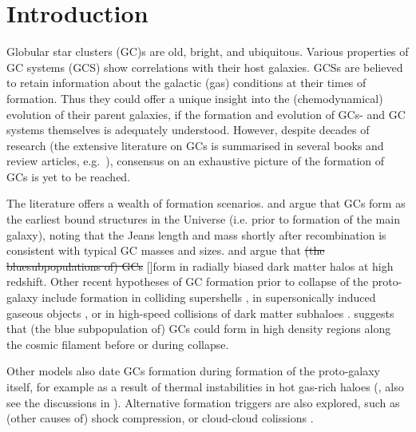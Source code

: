 \documentclass[a4paper,fleqn,usenatbib]{mnras}
\providecommand{\DIFadd}[1]{{\protect\color{blue}\uwave{#1}}} %
\providecommand{\DIFdel}[1]{{\protect\color{red}\sout{#1}}}                      %
\providecommand{\DIFaddbegin}{} %
\providecommand{\DIFaddend}{} %
\providecommand{\DIFdelbegin}{} %
\providecommand{\DIFdelend}{} %
\newcommand{\DIFscaledelfig}{0.5}
\newlength{\DIFdelgraphicswidth} %
\newlength{\DIFdelgraphicsheight} %
\newcommand{\DIFaddincludegraphics}[2][]{{\color{blue}\fbox{\DIFOincludegraphics[#1]{#2}}}} %
\newcommand{\DIFdelincludegraphics}[2][]{%
\sbox{\DIFdelgraphicsbox}{\DIFOincludegraphics[#1]{#2}}%
\settoboxwidth{\DIFdelgraphicswidth}{\DIFdelgraphicsbox} %
\settoboxtotalheight{\DIFdelgraphicsheight}{\DIFdelgraphicsbox} %
\scalebox{\DIFscaledelfig}{%
\parbox[b]{\DIFdelgraphicswidth}{\usebox{\DIFdelgraphicsbox}\\[-\baselineskip] \rule{\DIFdelgraphicswidth}{0em}}\llap{\resizebox{\DIFdelgraphicswidth}{\DIFdelgraphicsheight}{%
\setlength{\unitlength}{\DIFdelgraphicswidth}%
\begin{picture}(1,1)%
\thicklines\linethickness{2pt} %
{\color[rgb]{1,0,0}\put(0,0){\framebox(1,1){}}}%
{\color[rgb]{1,0,0}\put(0,0){\line( 1,1){1}}}%
{\color[rgb]{1,0,0}\put(0,1){\line(1,-1){1}}}%
\end{picture}%
}\hspace*{3pt}}} %
} %
\DeclareRobustCommand{\DIFaddbegin}{\DIFOaddbegin \let\includegraphics\DIFaddincludegraphics} %
\DeclareRobustCommand{\DIFaddend}{\DIFOaddend \let\includegraphics\DIFOincludegraphics} %
\DeclareRobustCommand{\DIFdelbegin}{\DIFOdelbegin \let\includegraphics\DIFdelincludegraphics} %
\DeclareRobustCommand{\DIFdelend}{\DIFOaddend \let\includegraphics\DIFOincludegraphics} %
\begin{document}


\section{Introduction}
Globular star clusters (GC)s are old, bright, and ubiquitous. Various properties of
GC systems (GCS) show correlations with their host galaxies. GCSs are believed to
retain information about the galactic (gas) conditions at their times of formation.
Thus they could offer a unique insight into the (chemodynamical) evolution of their 
parent galaxies, if the formation and evolution of GCs- and GC systems themselves 
is adequately understood. However, despite decades of research (the extensive 
literature on GCs is summarised in several books and review articles, e.g.~\citealt{
1991ARA&A..29..543H, Harris2001, 2004Natur.427...31W, 2006ARA&A..44..193B, 
2012A&ARv..20...50G, 2014CQGra..31x4006K, 2018RSPSA.47470616F}), consensus on an 
exhaustive picture of the formation of GCs is yet to be reached.

The literature offers a wealth of formation scenarios. \citet{1968ApJ...154..891P}
and \citet{1984ApJ...277..470P} argue that GCs form as the earliest bound
structures in the Universe (i.e. prior to formation of the main galaxy), 
noting that the Jeans length and mass shortly after recombination is consistent
with typical GC masses and sizes. \citet{2005MNRAS.364..367D} and \citet{
2009ApJ...706L.192B} argue that \DIFdelbegin \DIFdel{(the bluesubpopulations of) GCs }\DIFdelend \DIFaddbegin \DIFadd{the blue, metal-poor GCs (}[\DIFadd{Fe/H}]\DIFadd{$ < -1$) }\DIFaddend form in 
radially biased dark matter \DIFaddbegin \DIFadd{(DM) }\DIFaddend halos at high redshift. Other recent hypotheses 
of GC formation prior to collapse of the proto-galaxy include formation in colliding 
supershells \citep{2017Ap&SS.362..183R}, in supersonically induced gaseous objects
\citep{2019arXiv190408941C}, or in high-speed collisions of dark matter subhaloes
\citep{2019arXiv190508951M}. \citet{2017MNRAS.472.3120B} suggests
that (the blue subpopulation of) GCs could form in high density regions along
the cosmic filament before or during collapse.

Other models also date GCs formation during formation of the proto-galaxy itself,
for example as a result of thermal instabilities in hot gas-rich haloes 
(\citealt{1985ApJ...298...18F}, also see the discussions in \citealt{
1990ApJ...363..488K}). Alternative formation triggers are also explored, such as 
(other causes of) shock compression, or cloud-cloud colissions \citep[e.g.][]{
1980glcl.conf..301G, 1992ApJ...400..265M, 1994ApJ...429..177H, 1995ApJ...442..618V,
1996ASPC...92..241L, 2001ApJ...560..592C}. 
\end{document}
